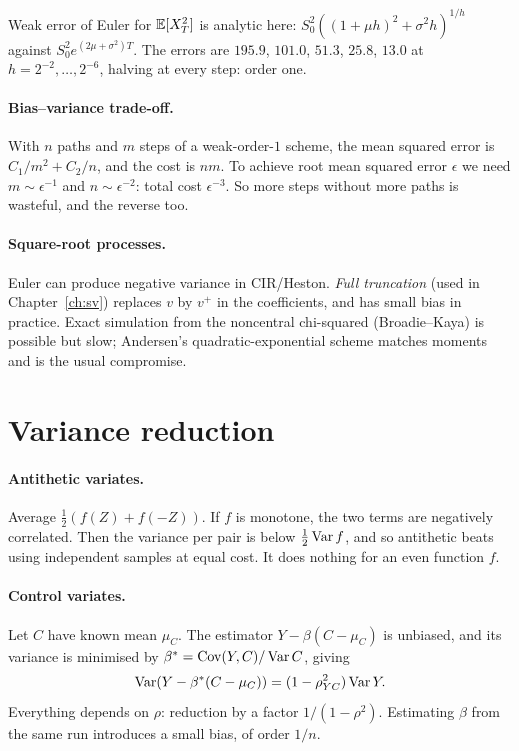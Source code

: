 \begin{numcheck}
Weak error of Euler for $\mathbb{E}[X_T^2]$ is analytic here: $S_0^2((1+\mu h)^2+\sigma^2h)^{1/h}$ against $S_0^2e^{(2\mu+\sigma^2)T}$. The errors are $195.9$, $101.0$, $51.3$, $25.8$, $13.0$ at $h=2^{-2},\dots,2^{-6}$, halving at every step: order one.
\end{numcheck}

\paragraph{Bias--variance trade-off.} With $n$ paths and $m$ steps of a weak-order-$1$ scheme, the mean squared error is $C_1/m^2+C_2/n$, and the cost is $nm$. To achieve root mean squared error $\epsilon$ we need $m\sim\epsilon^{-1}$ and $n\sim\epsilon^{-2}$: total cost $\epsilon^{-3}$. So more steps without more paths is wasteful, and the reverse too.

\paragraph{Square-root processes.} Euler can produce negative variance in CIR/Heston. \emph{Full truncation} (used in Chapter~\ref{ch:sv}) replaces $v$ by $v^+$ in the coefficients, and has small bias in practice. Exact simulation from the noncentral chi-squared (Broadie--Kaya) is possible but slow; Andersen's quadratic-exponential scheme matches moments and is the usual compromise.

\section{Variance reduction}

\paragraph{Antithetic variates.} Average $\frac12(f(Z)+f(-Z))$. If $f$ is monotone, the two terms are negatively correlated. Then the variance per pair is below $\frac12\operatorname{Var} f$, and so antithetic beats using independent samples at equal cost. It does nothing for an even function $f$.

\paragraph{Control variates.} Let $C$ have known mean $\mu_C$. The estimator $Y-\beta(C-\mu_C)$ is unbiased, and its variance is minimised by $\beta^*=\operatorname{Cov}(Y,C)/\operatorname{Var} C$, giving
\[
\operatorname{Var}(Y-\beta^*(C-\mu_C))=(1-\rho_{YC}^2)\operatorname{Var} Y.
\]
Everything depends on $\rho$: reduction by a factor $1/(1-\rho^2)$. Estimating $\beta$ from the same run introduces a small bias, of order $1/n$.

